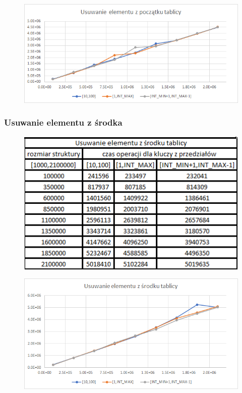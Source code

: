 \documentclass{article}
\begin{document}
\begin{figure}[h!]
    \centering
    \includegraphics[width=11.3cm]{images/usuwanie_poczatek_tab.png}
\end{figure}

\newpage

\subsubsection*{Usuwanie elementu z środka}

\begin{figure}[h!]
    \centering
    \includegraphics{images/Usuwanie_srodek.png}
\end{figure}

\begin{figure}[h!]
    \centering
    \includegraphics[width=11.3cm]{images/usuwanie_srodek_wykres.png}
\end{figure}
\end{document}
